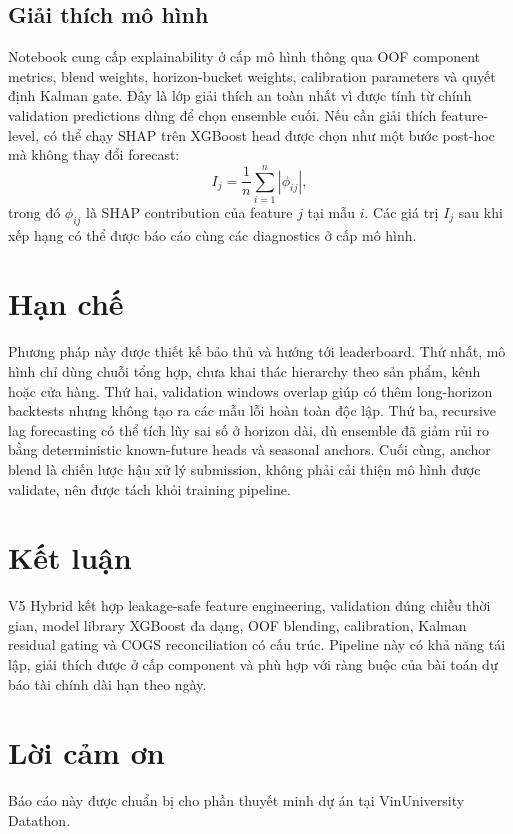\documentclass{article}
\begin{document}
\subsection{Giải thích mô hình}

Notebook cung cấp explainability ở cấp mô hình thông qua OOF component metrics,
blend weights, horizon-bucket weights, calibration parameters và quyết định
Kalman gate. Đây là lớp giải thích an toàn nhất vì được tính từ chính validation
predictions dùng để chọn ensemble cuối. Nếu cần giải thích feature-level, có thể
chạy SHAP trên XGBoost head được chọn như một bước post-hoc mà không thay đổi
forecast:
\begin{equation}
  I_j = \frac{1}{n}\sum_{i=1}^{n} |\phi_{ij}|,
\end{equation}
trong đó $\phi_{ij}$ là SHAP contribution của feature $j$ tại mẫu $i$. Các giá
trị $I_j$ sau khi xếp hạng có thể được báo cáo cùng các diagnostics ở cấp mô
hình.

\section{Hạn chế}

Phương pháp này được thiết kế bảo thủ và hướng tới leaderboard. Thứ nhất, mô
hình chỉ dùng chuỗi tổng hợp, chưa khai thác hierarchy theo sản phẩm, kênh hoặc
cửa hàng. Thứ hai, validation windows overlap giúp có thêm long-horizon
backtests nhưng không tạo ra các mẫu lỗi hoàn toàn độc lập. Thứ ba, recursive
lag forecasting có thể tích lũy sai số ở horizon dài, dù ensemble đã giảm rủi ro
bằng deterministic known-future heads và seasonal anchors. Cuối cùng, anchor
blend là chiến lược hậu xử lý submission, không phải cải thiện mô hình được
validate, nên được tách khỏi training pipeline.

\section{Kết luận}

V5 Hybrid kết hợp leakage-safe feature engineering, validation đúng chiều thời
gian, model library XGBoost đa dạng, OOF blending, calibration, Kalman residual
gating và COGS reconciliation có cấu trúc. Pipeline này có khả năng tái lập,
giải thích được ở cấp component và phù hợp với ràng buộc của bài toán dự báo tài
chính dài hạn theo ngày.

\section*{Lời cảm ơn}

Báo cáo này được chuẩn bị cho phần thuyết minh dự án tại VinUniversity Datathon.





% 
\end{document}
